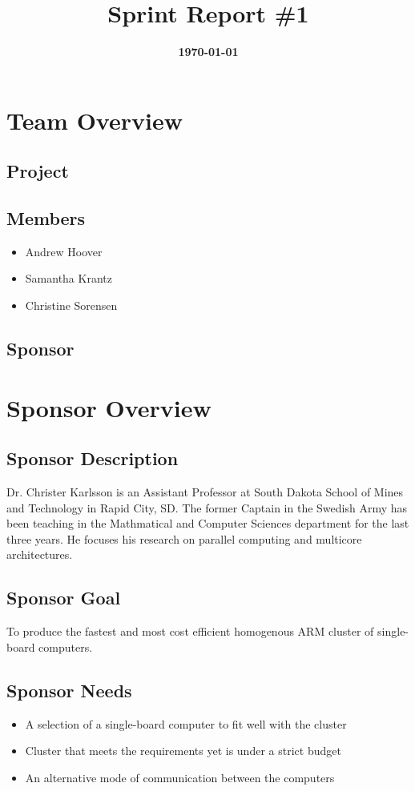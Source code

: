 \documentclass{article}
\title{\normalfont\Large\bfseries\color{TitleColor}Sprint Report \#1}
\date{\normalfont\bfseries\color{TitleColor}\today}
\begin{document}
\maketitle

\section*{Team Overview}
\subsection*{Project}

\subsection*{Members}
\begin{itemize}
	\item Andrew Hoover
	\item Samantha Krantz
	\item Christine Sorensen
\end{itemize}

\subsection*{Sponsor}

\section*{Sponsor Overview}
\subsection*{Sponsor Description}
Dr. Christer Karlsson is an Assistant Professor at South Dakota School of Mines and Technology in Rapid City, SD. The former Captain in the Swedish Army has been teaching in the Mathmatical and Computer Sciences department for the last three years. He focuses his research on parallel computing and multicore architectures.

\subsection*{Sponsor Goal}
To produce the fastest and most cost efficient homogenous ARM cluster of single-board computers.

\subsection*{Sponsor Needs}
\begin{itemize}
	\item A selection of a single-board computer to fit well with the cluster
	\item Cluster that meets the requirements yet is under a strict budget
	\item An alternative mode of communication between the computers
\end{itemize}
\end{document}
